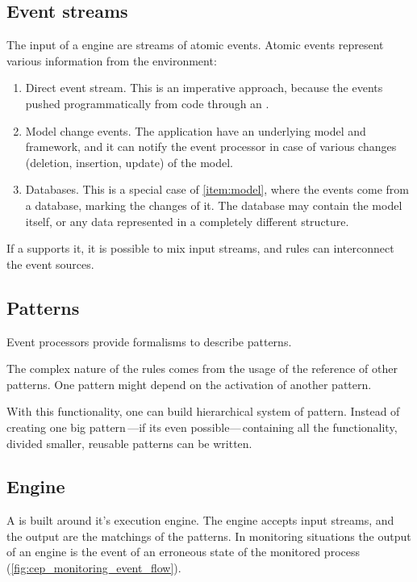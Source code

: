 \subsection{Event streams}
\label{subsec:cep_eventstream}
\label{subsection:event_streams}
The input of a \cep{} engine are streams of atomic events. Atomic events represent various information from the environment:
\begin{enumerate}
	\item Direct event stream. This is an imperative approach, because the events pushed programmatically from code through an .

	\item Model change events. The application have an underlying model and framework, and it can notify the event processor in case of various changes (deletion, insertion, update) of the model.\label{item:model}

	\item Databases. This is a special case of \cref{item:model}, where the events come from a database, marking the changes of it. The database may contain the model itself, or any data represented in a completely different structure.
\end{enumerate}
\vspace{1ex}
If a \cep{} supports it, it is possible to mix input streams, and rules can interconnect the event sources.

\subsection{Patterns}
\label{subsec:cep_patterns}
Event processors provide formalisms to describe patterns.

The complex nature of the rules comes from the usage of the reference of other patterns. One pattern might depend on the activation of another pattern.

With this functionality, one can build hierarchical system of pattern. Instead of creating one big pattern\,---if its even possible---\,containing all the functionality, divided smaller, reusable patterns can be written.

\subsection{Engine}
\label{subsec:cep_engine}

A \cep{} is built around it's execution engine. The engine accepts input streams, and the output are the matchings of the patterns. In monitoring situations the output of an engine is the event of an erroneous state of the monitored process (\cref{fig:cep_monitoring_event_flow}).

